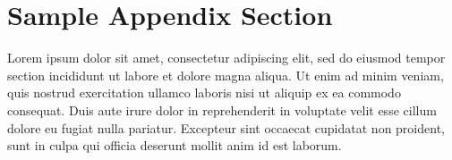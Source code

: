 \documentclass[final,3p,times,twocolumn]{elsarticle}
\begin{document}
 


\appendix

\section{Sample Appendix Section}
\label{sec:sample:appendix}
Lorem ipsum dolor sit amet, consectetur adipiscing elit, sed do eiusmod tempor section incididunt ut labore et dolore magna aliqua. Ut enim ad minim veniam, quis nostrud exercitation ullamco laboris nisi ut aliquip ex ea commodo consequat. Duis aute irure dolor in reprehenderit in voluptate velit esse cillum dolore eu fugiat nulla pariatur. Excepteur sint occaecat cupidatat non proident, sunt in culpa qui officia deserunt mollit anim id est laborum.

  
 





\end{document}
